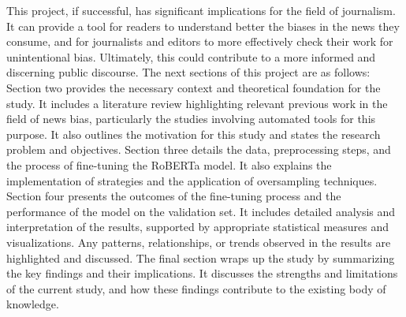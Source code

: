 \documentclass[11pt,a4paper]{article}
\begin{document}
This project, if successful, has significant implications for the field of journalism. It can provide a tool for readers to understand better the biases in the news they consume, and for journalists and editors to more effectively check their work for unintentional bias. Ultimately, this could contribute to a more informed and discerning public discourse.
The next sections of this project are as follows:
Section two provides the necessary context and theoretical foundation for the study. It includes a literature review highlighting relevant previous work in the field of news bias, particularly the studies involving automated tools for this purpose. It also outlines the motivation for this study and states the research problem and objectives. Section three details the data, preprocessing steps, and the process of fine-tuning the RoBERTa model. It also explains the implementation of strategies and the application of oversampling techniques. Section four presents the outcomes of the fine-tuning process and the performance of the model on the validation set. It includes detailed analysis and interpretation of the results, supported by appropriate statistical measures and visualizations. Any patterns, relationships, or trends observed in the results are highlighted and discussed. The final section wraps up the study by summarizing the key findings and their implications. It discusses the strengths and limitations of the current study, and how these findings contribute to the existing body of knowledge.
\end{document}
